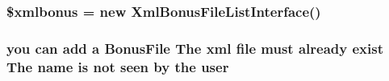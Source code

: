\subsubsection{\setlength{\rightskip}{0pt plus 5cm}\$xmlbonus = new {\bf Xml\-Bonus\-File\-List\-Interface}()}\label{addbonusfile_8php_66cabf2391f95b889df2bf0cbeb3e59c}


\subsubsection{\setlength{\rightskip}{0pt plus 5cm}you can add a Bonus\-File The xml file must already exist The name {\bf is} not seen by the {\bf user}}\label{addbonusfile_8php_c5a95cf625ceb3db24d5f2675fd9e268}


